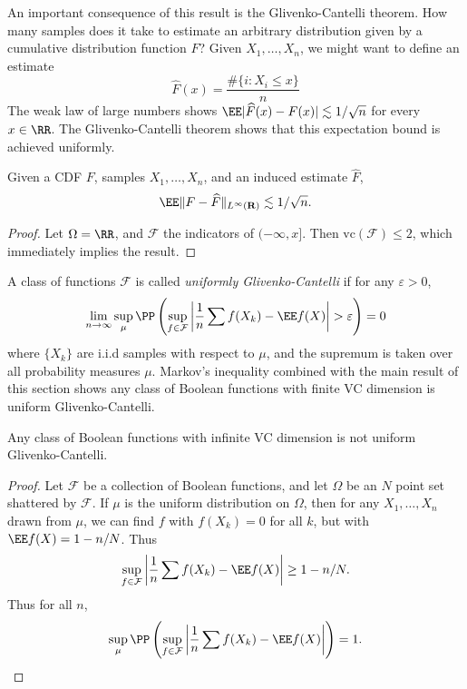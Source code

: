 An important consequence of this result is the Glivenko-Cantelli theorem. How many samples does it take to estimate an arbitrary distribution given by a cumulative distribution function $F$? Given $X_1, \dots, X_n$, we might want to define an estimate
%
\[ \widehat{F}(x) = \frac{\# \{ i : X_i \leq x \}}{n} \]
%
The weak law of large numbers shows $\EE| \widehat{F}(x) - F(x) | \lesssim 1/\sqrt{n}$ for every $x \in \RR$. The Glivenko-Cantelli theorem shows that this expectation bound is achieved uniformly.

\begin{theorem}
	Given a CDF $F$, samples $X_1, \dots, X_n$, and an induced estimate $\widehat{F}$,
	\[ \EE \| F - \widehat{F} \|_{L^\infty(\mathbf{R})} \lesssim 1/\sqrt{n}. \]
\end{theorem}
\begin{proof}
	Let $\Omega = \RR$, and $\mathcal{F}$ the indicators of $(-\infty,x]$. Then $\text{vc}(\mathcal{F}) \leq 2$, which immediately implies the result.
\end{proof}

\begin{remark}
	A class of functions $\mathcal{F}$ is called {\it uniformly Glivenko-Cantelli} if for any $\varepsilon > 0$,
	\[ \lim_{n \to \infty} \sup_\mu \PP \left( \sup_{f \in \mathcal{F}} \left| \frac{1}{n} \sum f(X_k) - \EE f(X) \right| > \varepsilon \right) = 0 \]
	where $\{ X_k \}$ are i.i.d samples with respect to $\mu$, and the supremum is taken over all probability measures $\mu$. Markov's inequality combined with the main result of this section shows any class of Boolean functions with finite VC dimension is uniform Glivenko-Cantelli.
\end{remark}

\begin{theorem}
	Any class of Boolean functions with infinite VC dimension is not uniform Glivenko-Cantelli.
\end{theorem}
\begin{proof}
	Let $\mathcal{F}$ be a collection of Boolean functions, and let $\Omega$ be an $N$ point set shattered by $\mathcal{F}$. If $\mu$ is the uniform distribution on $\Omega$, then for any $X_1, \dots, X_n$ drawn from $\mu$, we can find $f$ with $f(X_k) = 0$ for all $k$, but with $\EE f(X) = 1 - n/N$. Thus
	\[ \sup_{f \in \mathcal{F}} \left| \frac{1}{n} \sum f(X_k) - \EE f(X) \right| \geq 1 - n/N. \]
	Thus for all $n$,
	\[ \sup_\mu \PP \left( \sup_{f \in \mathcal{F}} \left| \frac{1}{n} \sum f(X_k) - \EE f(X) \right| \right) = 1. \]
\end{proof}

